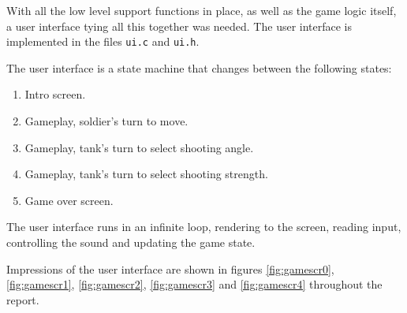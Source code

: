 With all the low level support functions in place, as well as the game
logic itself, a user interface tying all this together was needed. The
user interface is implemented in the files \texttt{ui.c} and
\texttt{ui.h}.

The user interface is a state machine that changes between the following
states:

\begin{enumerate}
    \item Intro screen.
    \item Gameplay, soldier's turn to move.
    \item Gameplay, tank's turn to select shooting angle.
    \item Gameplay, tank's turn to select shooting strength.
    \item Game over screen.
\end{enumerate}

The user interface runs in an infinite loop, rendering to the screen,
reading input, controlling the sound and updating the game state.

Impressions of the user interface are shown in figures
\ref{fig:gamescr0}, \ref{fig:gamescr1}, \ref{fig:gamescr2},
\ref{fig:gamescr3} and \ref{fig:gamescr4} throughout the report.


